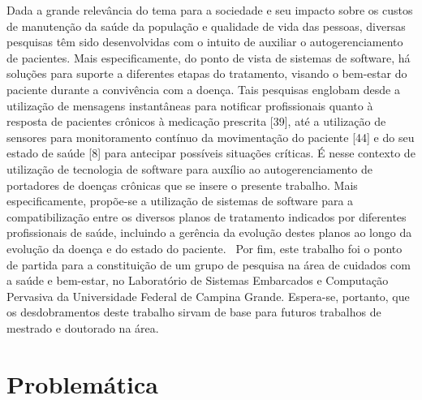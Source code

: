 Dada a grande relevância do tema para a sociedade e seu impacto sobre os
custos de manutenção da saúde da população e qualidade de vida das pessoas,
diversas pesquisas têm sido desenvolvidas com o intuito de auxiliar o autogerenciamento
de pacientes. Mais especificamente, do ponto de vista de sistemas de
software, há soluções para suporte a diferentes etapas do tratamento, visando o
bem-estar do paciente durante a convivência com a doença. Tais pesquisas englobam
desde a utilização de mensagens instantâneas para notificar profissionais
quanto à resposta de pacientes crônicos à medicação prescrita [39], até a utilização
de sensores para monitoramento contínuo da movimentação do paciente [44] e do
seu estado de saúde [8] para antecipar possíveis situações críticas.
É nesse contexto de utilização de tecnologia de software para auxílio ao autogerenciamento
de portadores de doenças crônicas que se insere o presente trabalho.
Mais especificamente, propõe-se a utilização de sistemas de software para a
compatibilização entre os diversos planos de tratamento indicados por diferentes
profissionais de saúde, incluindo a gerência da evolução destes planos ao longo da
evolução da doença e do estado do paciente.~\cite{glauber}
Por fim, este trabalho foi o ponto de partida para a constituição de um grupo
de pesquisa na área de cuidados com a saúde e bem-estar, no Laboratório de Sistemas
Embarcados e Computação Pervasiva da Universidade Federal de Campina
Grande. Espera-se, portanto, que os desdobramentos deste trabalho sirvam de
base para futuros trabalhos de mestrado e doutorado na área.~\cite{glauber}



\section{Problemática}\label{section:problematica}


